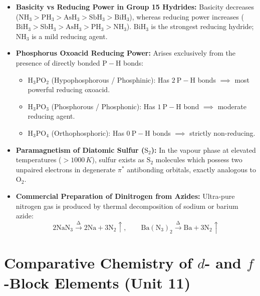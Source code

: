 \documentclass[10pt,twoside,openright]{book}
\begin{document}
\begin{ncertbox}
\begin{itemize}
  \item \textbf{Basicity vs Reducing Power in Group 15 Hydrides:} Basicity decreases ($\mathrm{NH_3 > PH_3 > AsH_3 > SbH_3 > BiH_3}$), whereas reducing power increases ($\mathrm{BiH_3 > SbH_3 > AsH_3 > PH_3 > NH_3}$). $\mathrm{BiH_3}$ is the strongest reducing hydride; $\mathrm{NH_3}$ is a mild reducing agent.
  \item \textbf{Phosphorus Oxoacid Reducing Power:} Arises exclusively from the presence of directly bonded $\mathrm{P-H}$ bonds:
  \begin{itemize}
    \item $\mathrm{H_3PO_2}$ (Hypophosphorous / Phosphinic): Has $2\ \mathrm{P-H}$ bonds $\implies$ most powerful reducing oxoacid.
    \item $\mathrm{H_3PO_3}$ (Phosphorous / Phosphonic): Has $1\ \mathrm{P-H}$ bond $\implies$ moderate reducing agent.
    \item $\mathrm{H_3PO_4}$ (Orthophosphoric): Has $0\ \mathrm{P-H}$ bonds $\implies$ strictly non-reducing.
  \end{itemize}
  \item \textbf{Paramagnetism of Diatomic Sulfur ($\mathrm{S_2}$):} In the vapour phase at elevated temperatures ($> 1000\,\si{K}$), sulfur exists as $\mathrm{S_2}$ molecules which possess two unpaired electrons in degenerate $\pi^*$ antibonding orbitals, exactly analogous to $\mathrm{O_2}$.
  \item \textbf{Commercial Preparation of Dinitrogen from Azides:} Ultra-pure nitrogen gas is produced by thermal decomposition of sodium or barium azide:
  \begin{equation*}
    \mathrm{2NaN_3 \xrightarrow{\Delta} 2Na + 3N_2\uparrow}, \qquad \mathrm{Ba(N_3)_2 \xrightarrow{\Delta} Ba + 3N_2\uparrow}
  \end{equation*}
\end{itemize}
\end{ncertbox}

\section{Comparative Chemistry of $d$- and $f$-Block Elements (Unit 11)}
\end{document}
